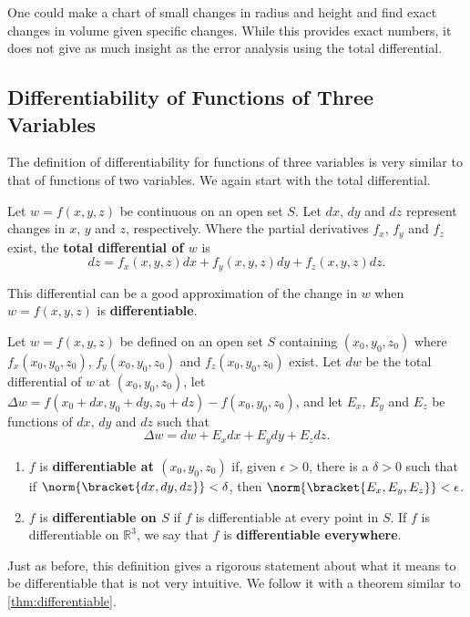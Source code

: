 One could make a chart of small changes in radius and height and find exact changes in volume given specific changes. While this provides exact numbers, it does not give as much insight as the error analysis using the total differential.

\subsection*{Differentiability of Functions of Three Variables}

The definition of differentiability for functions of three variables is very similar to that of functions of two variables. We again start with the total differential.

{Let $w=f(x,y,z)$ be continuous on an open set $S$. Let $dx$, $dy$ and $dz$ represent changes in $x$, $y$ and  $z$, respectively. Where the partial derivatives $f_x$, $f_y$ and $f_z$ exist, the \textbf{total differential of $w$} is
\[dz = f_x(x,y,z)dx + f_y(x,y,z)dy+f_z(x,y,z)dz.\]
}

This differential can be a good approximation of the change in $w$ when $w = f(x,y,z)$ is \textbf{differentiable}.

{Let $w=f(x,y,z)$ be defined on an open set $S$ containing $(x_0,y_0,z_0)$ where $f_x(x_0,y_0,z_0)$, $f_y(x_0,y_0,z_0)$ and $f_z(x_0,y_0,z_0)$ exist. Let $dw$ be the total differential of $w$ at $(x_0,y_0,z_0)$, let $\Delta w = f(x_0+dx,y_0+dy,z_0+dz) - f(x_0,y_0,z_0)$, and let $E_x$, $E_y$ and $E_z$ be functions of $dx$, $dy$ and $dz$  such that
\[\Delta w = dw + E_xdx + E_ydy + E_zdz.\]
\begin{enumerate}
	\item $f$ is \textbf{differentiable at $(x_0,y_0,z_0)$} if, given $\epsilon >0$, there is a $\delta >0$ such that if $\norm{\bracket{dx,dy,dz}}< \delta$, then $\norm{\bracket{E_x,E_y,E_z}}<\epsilon$. 
	\item	$f$ is \textbf{differentiable on $S$} if $f$ is differentiable at every point in $S$. If $f$ is differentiable on $\mathbb{R}^3$, we say that $f$ is \textbf{differentiable everywhere}.
\end{enumerate}}

Just as before, this definition gives a rigorous statement about what it means to be differentiable that is not very intuitive. We follow it with a theorem similar to \autoref{thm:differentiable}.

